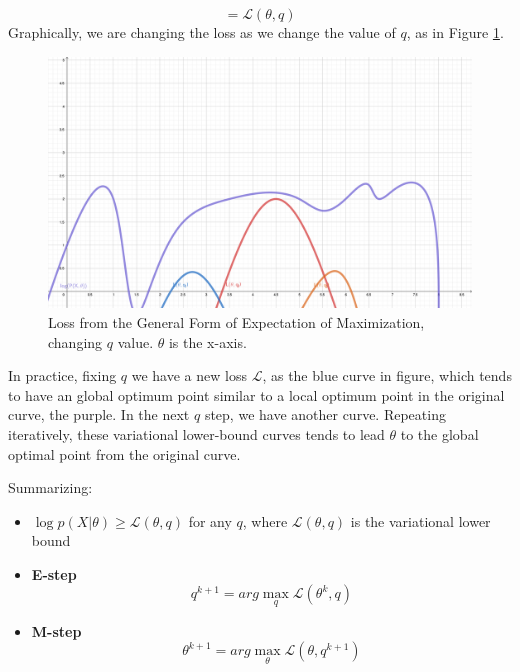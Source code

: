 \documentclass{article}
\begin{document}
\begin{equation}
    = \mathcal{L}(\theta, q)
\end{equation}
Graphically, we are changing the loss as we change the value of $q$, as in Figure \ref{fig:L}.
\begin{figure}
    \centering
    \includegraphics[width=\textwidth]{L.pdf}
    \caption{Loss from the General Form of Expectation of Maximization, changing $q$ value. $\theta$ is the x-axis.}
    \label{fig:L}
\end{figure}
In practice, fixing $q$ we have a new loss $\mathcal{L}$, as the blue curve in figure, which tends to have an global optimum point similar to a local optimum point in the original curve, the purple. In the next $q$ step, we have another curve. Repeating iteratively, these variational lower-bound curves tends to lead $\theta$ to the global optimal point from the original curve.

Summarizing:
\begin{itemize}
    \item $\log p(X|\theta) \geq \mathcal{L}(\theta, q)$ for any $q$, where $\mathcal{L}(\theta, q)$ is the variational lower bound
    \item \textbf{E-step} \begin{equation}
        q^{k+1} = arg \max_q \mathcal{L}(\theta^k, q)
    \end{equation}
    \item \textbf{M-step} \begin{equation}
        \theta^{k+1} = arg \max_\theta \mathcal{L}(\theta, q^{k+1})
    \end{equation}
\end{itemize}
\end{document}

